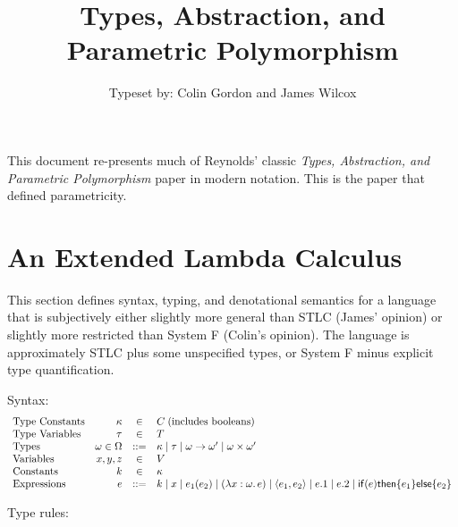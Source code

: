 \documentclass{article}
\title{Types, Abstraction, and Parametric Polymorphism}
\author{Typeset by: Colin Gordon and James Wilcox}
\begin{document}
\maketitle
This document re-presents much of Reynolds' classic \emph{Types, Abstraction, and Parametric
Polymorphism} paper in modern notation.  This is the paper that defined parametricity.

\section*{An Extended Lambda Calculus}
This section defines syntax, typing, and denotational semantics for a language that is subjectively either
slightly more general than STLC (James' opinion) or slightly more restricted than System F (Colin's
opinion).  The language is approximately STLC plus some unspecified types, or System F minus
explicit type quantification.

Syntax:
\newcommand{\cond}[3]{\ensuremath{\mathsf{if}(#1)\mathsf{then}\{#2\}\mathsf{else}\{#3\}}}
\[
    \begin{array}{lrcl}
        \textrm{Type Constants} & \kappa & \in & C \;\textrm{(includes booleans)}\\
        \textrm{Type Variables} & \tau & \in & T\\
        \textrm{Types} & \omega\in\Omega & ::= & \kappa \mid \tau \mid \omega \rightarrow \omega'
        \mid \omega \times \omega'\\
        \textrm{Variables} & x,y,z & \in & V\\
        \textrm{Constants} & k & \in & \kappa\\
        \textrm{Expressions} & e & ::= & k \mid x \mid e_1(e_2) \mid (\lambda x:\omega\ldotp e) \mid
        \langle e_1 , e_2 \rangle \mid e.1 \mid e.2 \mid \cond{e}{e_1}{e_2}
    \end{array}
\]

Type rules:
\end{document}
